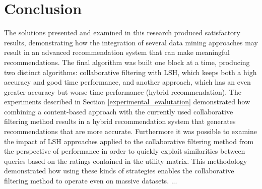 \section{Conclusion}

The solutions presented and examined in this research produced satisfactory results, demonstrating how the integration of several data mining approaches may result in an advanced recommendation system that can make meaningful recommendations. The final algorithm was built one block at a time, producing two distinct algorithms: collaborative filtering with LSH, which keeps both a high accuracy and good time performance, and another approach, which has an even greater accuracy but worse time performance (hybrid recommendation). The experiments described in Section \ref{experimental_evalutation} demonstrated how combining a content-based approach with the currently used collaborative filtering method results in a hybrid recommendation system that generates recommendations that are more accurate. Furthermore it was possible to examine the impact of LSH approaches applied to the collaborative filtering method from the perspective of performance in order to quickly exploit similarities between queries based on the ratings contained in the utility matrix. This methodology demonstrated how using these kinds of strategies enables the collaborative filtering method to operate even on massive datasets. 
...